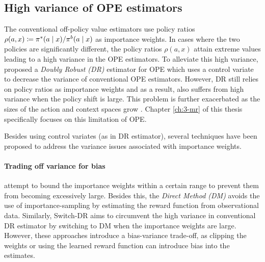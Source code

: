 \subsection{High variance of OPE estimators}\label{subsec:high-variance}
The conventional off-policy value estimators use policy ratios $\rho(a, x) \coloneqq \pi^*(a\mid x)/\pi^b(a\mid x)$ as importance weights. 
In cases where the two policies are significantly different, the policy ratios $\rho(a, x)$ attain extreme values leading to a high variance in the OPE estimators. 
To alleviate this high variance, \cite{dudik2014doubly} proposed a \emph{Doubly Robust (DR)} estimator for OPE which uses a control variate to decrease the variance of conventional OPE estimators. 
However, DR still relies on policy ratios as importance weights and as a result, also suffers from high variance when the policy shift is large. 
This problem is further exacerbated as the sizes of the action and context spaces grow \citep{sachdeva2020off, saito2022off}.
Chapter \ref{ch:3-mr} of this thesis specifically focuses on this limitation of OPE. 

Besides using control variates (as in DR estimator), several techniques have been proposed to address the variance issues associated with importance weights. 

\paragraph{Trading off variance for bias}
\cite{swaminathan2015counterfactual, swaminathan2015the, chaudhuri2019london} attempt to bound the importance weights within a certain range to prevent them from becoming excessively large. 
Besides this, the \emph{Direct Method (DM)} \citep{Beygelzimer2008Offset} avoids the use of importance-sampling by estimating the reward function from observational data.
Similarly, Switch-DR \citep{wang2017optimal} aims to circumvent the high variance in conventional DR estimator by switching to DM when the importance weights are large.
However, these approaches introduce a bias-variance trade-off, as clipping the weights or using the learned reward function can introduce bias into the estimates. 


